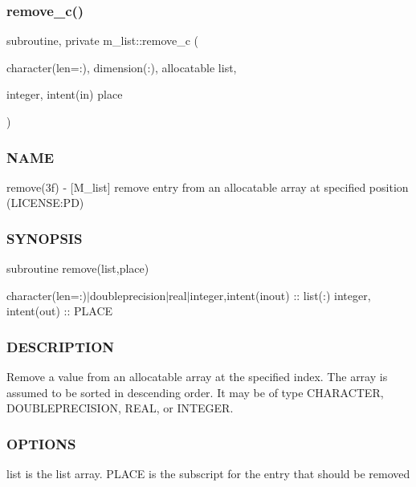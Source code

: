 \subsubsection{\texorpdfstring{remove\+\_\+c()}{remove\_c()}}
{\footnotesize\ttfamily subroutine, private m\+\_\+list\+::remove\+\_\+c (\begin{DoxyParamCaption}\item[{character(len=\+:), dimension(\+:), allocatable}]{list,  }\item[{integer, intent(in)}]{place }\end{DoxyParamCaption})\hspace{0.3cm}{\ttfamily [private]}}



\subsubsection*{N\+A\+ME}

remove(3f) -\/ \mbox{[}M\+\_\+list\mbox{]} remove entry from an allocatable array at specified position (L\+I\+C\+E\+N\+SE\+:PD) 

\subsubsection*{S\+Y\+N\+O\+P\+S\+IS}

subroutine remove(list,place)

character(len=\+:)$\vert$doubleprecision$\vert$real$\vert$integer,intent(inout) \+:\+: list(\+:) integer, intent(out) \+:\+: P\+L\+A\+CE

\subsubsection*{D\+E\+S\+C\+R\+I\+P\+T\+I\+ON}

\begin{DoxyVerb}Remove a value from an allocatable array at the specified index.
The array is assumed to be sorted in descending order. It may be of
type CHARACTER, DOUBLEPRECISION, REAL, or INTEGER.
\end{DoxyVerb}


\subsubsection*{O\+P\+T\+I\+O\+NS}

\begin{DoxyVerb}list    is the list array.
PLACE   is the subscript for the entry that should be removed
\end{DoxyVerb}


